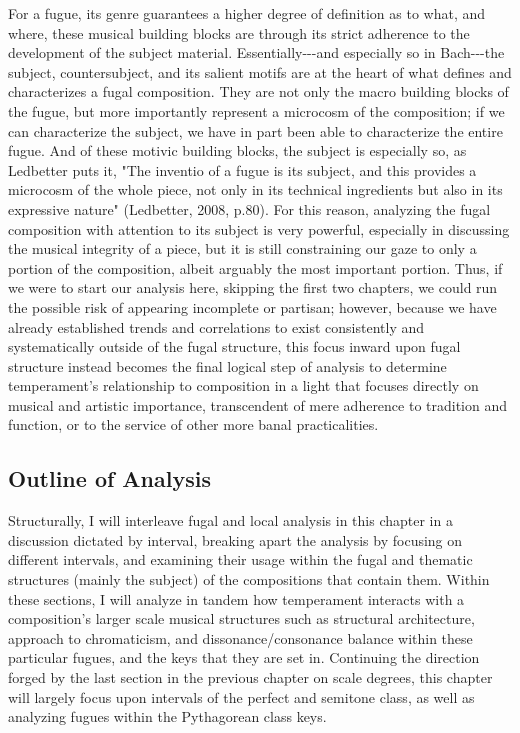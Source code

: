 For a fugue, its genre guarantees a higher degree of definition as to
what, and where, these musical building blocks are through its strict
adherence to the development of the subject material.
Essentially-\/-\/-and especially so in Bach-\/-\/-the subject,
countersubject, and its salient motifs are at the heart of what defines
and characterizes a fugal composition. They are not only the macro
building blocks of the fugue, but more importantly represent a microcosm
of the composition; if we can characterize the subject, we have in part
been able to characterize the entire fugue. And of these motivic
building blocks, the subject is especially so, as Ledbetter puts it,
"The inventio of a fugue is its subject, and this provides a microcosm
of the whole piece, not only in its technical ingredients but also in
its expressive nature" (Ledbetter, 2008, p.80). For this reason,
analyzing the fugal composition with attention to its subject is very
powerful, especially in discussing the musical integrity of a piece, but
it is still constraining our gaze to only a portion of the composition,
albeit arguably the most important portion. Thus, if we were to start
our analysis here, skipping the first two chapters, we could run the
possible risk of appearing incomplete or partisan; however, because we
have already established trends and correlations to exist consistently
and systematically outside of the fugal structure, this focus inward
upon fugal structure instead becomes the final logical step of analysis
to determine temperament's relationship to composition in a light that
focuses directly on musical and artistic importance, transcendent of
mere adherence to tradition and function, or to the service of other
more banal practicalities.

\subsection{Outline of Analysis}\label{outline-of-analysis}

Structurally, I will interleave fugal and local analysis in this chapter
in a discussion dictated by interval, breaking apart the analysis by
focusing on different intervals, and examining their usage within the
fugal and thematic structures (mainly the subject) of the compositions
that contain them. Within these sections, I will analyze in tandem how
temperament interacts with a composition's larger scale musical
structures such as structural architecture, approach to chromaticism,
and dissonance/consonance balance within these particular fugues, and
the keys that they are set in. Continuing the direction forged by the
last section in the previous chapter on scale degrees, this chapter will
largely focus upon intervals of the perfect and semitone class, as well
as analyzing fugues within the Pythagorean class keys.

